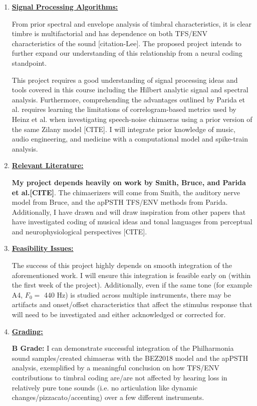 \documentclass[9pt]{article}
\begin{document}
\begin{enumerate}
\item \textbf{\underline{Signal Processing Algorithms:}}

From prior spectral and envelope analysis of timbral characteristics, it is clear timbre is multifactorial and has dependence on both TFS/ENV characteristics of the sound [citation-Lee]. The proposed project intends to further expand our understanding of this relationship from a neural coding standpoint. 

This project requires a good understanding of signal processing ideas and tools covered in this course including the Hilbert analytic signal and spectral analysis. Furthermore, comprehending the advantages outlined by Parida et al. requires learning the limitations of correlogram-based metrics used by Heinz et al. when investigating speech-noise chimaeras using a prior version of the same Zilany model [CITE]. I will integrate prior knowledge of music, audio engineering, and medicine with a computational model and spike-train analysis.   

\item \textbf{\underline{Relevant Literature:}}

\textbf{My project depends heavily on work by Smith, Bruce, and Parida et al.[CITE]}. The chimaerizers will come from Smith, the auditory nerve model from Bruce, and the apPSTH TFS/ENV  methods from Parida. Additionally, I have drawn and will draw inspiration from other papers that have investigated coding of musical ideas and tonal languages from perceptual and neurophysiological perspectives [CITE].

\item \textbf{\underline{Feasibility Issues:}}

The success of this project highly depends on smooth integration of the aforementioned work. I will ensure this integration is feasible early on (within the first week of the project). Additionally, even if the same tone (for example A4, $F_{0} = $ 440 Hz) is studied across multiple instruments, there may be artifacts and onset/offset characteristics that affect the stimulus response that will need to be investigated and either acknowledged or corrected for. 

\item \textbf{\underline{Grading: }}

\textbf{B Grade: }I can demonstrate successful integration of the Philharmonia sound samples/created chimaeras with the BEZ2018 model and the apPSTH analysis, exemplified by a meaningful conclusion on how TFS/ENV contributions to timbral coding are/are not affected by hearing loss in relatively pure tone sounds (i.e. no articulation like dynamic changes/pizzacato/accenting) over a few different instruments. 


\end{enumerate}
\end{document}
